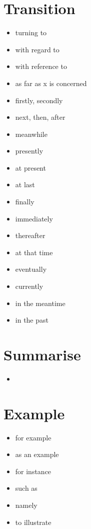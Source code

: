 \documentclass[twocolumn, a4paper]{article}
\begin{document}
\section{Transition}
{\color{NavyBlue}
	\begin{itemize}[leftmargin=*, noitemsep]
		\item turning to
		\item with regard to
		\item with reference to
		\item as far as x is concerned
		\item firstly, secondly
		\item next, then, after
		\item meanwhile
		\item presently
		\item at present
		\item at last
		\item finally
		\item immediately
		\item thereafter
		\item at that time
		\item eventually
		\item currently
		\item in the meantime
		\item in the past
	\end{itemize}
}


\section{Summarise}
{\color{Plum}
	\begin{itemize}[leftmargin=*, noitemsep]
		\item
	\end{itemize}
}

\section{Example}
{\color{Orchid}
	\begin{itemize}[leftmargin=*, noitemsep]
		\item for example
		\item as an example
		\item for instance
		\item such as
		\item namely
		\item to illustrate
	\end{itemize}
}
\end{document}
